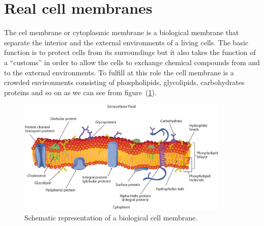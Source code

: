 \section{Real cell membranes}
The cel membrane or cytoplasmic membrane is a biological membrane that separate the interior and the external environments of a living cells. The basic function is to protect cells from its surroundings but it also takes the function of a ``customs'' in order to allow the cells to exchange chemical compounds from and to the external environments. To fulfill at this role the cell membrane is a crowded environments consisting of phospholipids, glycolipids, carbohydrates proteins and so on as we can see from figure~(\ref{fig:cellMembrane}).
\begin{figure}[!ht]
	\centering
	\includegraphics[width=0.9\textwidth]{./img/cellMembrane}
	\caption{Schematic representation of a biological cell membrane.}
	\label{fig:cellMembrane}
\end{figure}


